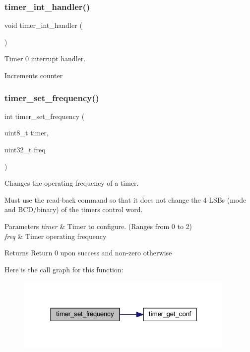 \subsubsection{\texorpdfstring{timer\_int\_handler()}{timer\_int\_handler()}}
{\footnotesize\ttfamily void timer\+\_\+int\+\_\+handler (\begin{DoxyParamCaption}{ }\end{DoxyParamCaption})}



Timer 0 interrupt handler. 

Increments counter \mbox{\label{group__timer_gaca1506be74dfc71c6f90772ca269c619}} 
\subsubsection{\texorpdfstring{timer\_set\_frequency()}{timer\_set\_frequency()}}
{\footnotesize\ttfamily int timer\+\_\+set\+\_\+frequency (\begin{DoxyParamCaption}\item[{uint8\+\_\+t}]{timer,  }\item[{uint32\+\_\+t}]{freq }\end{DoxyParamCaption})}



Changes the operating frequency of a timer. 

Must use the read-\/back command so that it does not change the 4 L\+S\+Bs (mode and B\+C\+D/binary) of the timer\textquotesingle{}s control word.


\begin{DoxyParams}{Parameters}
{\em timer} & Timer to configure. (Ranges from 0 to 2) \\
\hline
{\em freq} & Timer operating frequency \\
\hline
\end{DoxyParams}
\begin{DoxyReturn}{Returns}
Return 0 upon success and non-\/zero otherwise 
\end{DoxyReturn}
Here is the call graph for this function\+:
\nopagebreak
\begin{figure}[H]
\begin{center}
\leavevmode
\includegraphics[width=300pt]{group__timer_gaca1506be74dfc71c6f90772ca269c619_cgraph}
\end{center}
\end{figure}
\mbox{\label{group__timer_ga6f786481e80308348d629d605ffa2d84}} 
